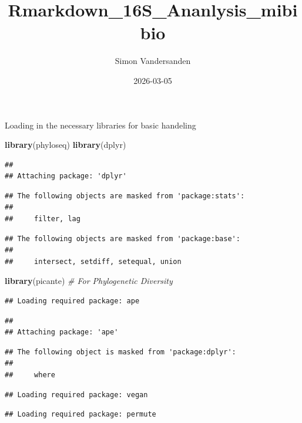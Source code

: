 \documentclass[
]{article}
\title{Rmarkdown\_16S\_Ananlysis\_mibibio}
\author{Simon Vandersanden}
\date{2026-03-05}
\newenvironment{Shaded}{\begin{snugshade}}{\end{snugshade}}
\newcommand{\CommentTok}[1]{\textcolor[rgb]{0.56,0.35,0.01}{\textit{#1}}}
\newcommand{\FunctionTok}[1]{\textcolor[rgb]{0.13,0.29,0.53}{\textbf{#1}}}
\newcommand{\NormalTok}[1]{#1}
\begin{document}
\maketitle

Loading in the necessary libraries for basic handeling

\begin{Shaded}
\begin{Highlighting}[]
\FunctionTok{library}\NormalTok{(phyloseq)}
\FunctionTok{library}\NormalTok{(dplyr)}
\end{Highlighting}
\end{Shaded}

\begin{verbatim}
## 
## Attaching package: 'dplyr'
\end{verbatim}

\begin{verbatim}
## The following objects are masked from 'package:stats':
## 
##     filter, lag
\end{verbatim}

\begin{verbatim}
## The following objects are masked from 'package:base':
## 
##     intersect, setdiff, setequal, union
\end{verbatim}

\begin{Shaded}
\begin{Highlighting}[]
\FunctionTok{library}\NormalTok{(picante)    }\CommentTok{\# For Phylogenetic Diversity}
\end{Highlighting}
\end{Shaded}

\begin{verbatim}
## Loading required package: ape
\end{verbatim}

\begin{verbatim}
## 
## Attaching package: 'ape'
\end{verbatim}

\begin{verbatim}
## The following object is masked from 'package:dplyr':
## 
##     where
\end{verbatim}

\begin{verbatim}
## Loading required package: vegan
\end{verbatim}

\begin{verbatim}
## Loading required package: permute
\end{verbatim}
\end{document}
